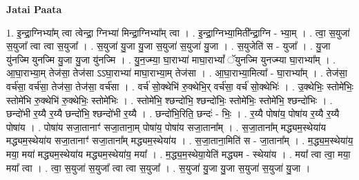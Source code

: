 \documentclass[17pt]{extarticle}
\begin{document}
\textbf{Jatai Paata} \newline

1. इ॒न्द्रा॒ग्निभ्या᳚म् त्वा त्वेन्द्रा॒ ग्निभ्या॑ मिन्द्रा॒ग्निभ्या᳚म् त्वा । . इ॒न्द्रा॒ग्निभ्या॒मिती᳚न्द्रा॒ग्नि - भ्या॒म् । . त्वा॒ स॒युजा॑ स॒युजा᳚ त्वा त्वा स॒युजा᳚ । . स॒युजा॑ यु॒जा यु॒जा स॒युजा॑ स॒युजा॑ यु॒जा । . स॒युजेति॑ स - युजा᳚ । . यु॒जा यु॑नज्मि युनज्मि यु॒जा यु॒जा यु॑नज्मि । . यु॒न॒ज्म्या॒ घा॒राभ्या॑ माघा॒राभ्यां᳚ ॅयुनज्मि युनज्म्या घा॒राभ्या᳚म् । . आ॒घा॒राभ्या॒म् तेज॑सा॒ तेज॑सा ऽऽघा॒राभ्या॑ माघा॒राभ्या॒म् तेज॑सा । . आ॒घा॒राभ्या॒मित्या᳚ - घा॒राभ्या᳚म् । . तेज॑सा॒ वर्च॑सा॒ वर्च॑सा॒ तेज॑सा॒ तेज॑सा॒ वर्च॑सा । . वर्च॑ सो॒क्थेभि॑ रु॒क्थेभि॒र् वर्च॑सा॒ वर्च॑ सो॒क्थेभिः॑ । . उ॒क्थेभिः॒ स्तोमे॑भिः॒ स्तोमे॑भि रु॒क्थेभि॑ रु॒क्थेभिः॒ स्तोमे॑भिः । . स्तोमे॑भि॒ श्छन्दो॑भि॒ श्छन्दो॑भिः॒ स्तोमे॑भिः॒ स्तोमे॑भि॒ श्छन्दो॑भिः । . छन्दो॑भी र॒य्यै र॒य्यै छन्दो॑भि॒ श्छन्दो॑भी र॒य्यै । . छन्दो॑भि॒रिति॒ छन्दः॑ - भिः॒ । . र॒य्यै पोषा॑य॒ पोषा॑य र॒य्यै र॒य्यै पोषा॑य । . पोषा॑य सजा॒तानाꣳ॑ सजा॒ताना॒म् पोषा॑य॒ पोषा॑य सजा॒ताना᳚म् । . स॒जा॒ताना᳚म् मद्ध्यम॒स्थेया॑य मद्ध्यम॒स्थेया॑य सजा॒तानाꣳ॑ सजा॒ताना᳚म् मद्ध्यम॒स्थेया॑य । . स॒जा॒ताना॒मिति॑ स - जा॒ताना᳚म् । . म॒द्ध्य॒म॒स्थेया॑य॒ मया॒ मया॑ मद्ध्यम॒स्थेया॑य मद्ध्यम॒स्थेया॑य॒ मया᳚ । . म॒द्ध्य॒म॒स्थेया॒येति॑ मद्ध्यम - स्थेया॑य । . मया᳚ त्वा त्वा॒ मया॒ मया᳚ त्वा । . त्वा॒ स॒युजा॑ स॒युजा᳚ त्वा त्वा स॒युजा᳚ । . स॒युजा॑ यु॒जा यु॒जा स॒युजा॑ स॒युजा॑ यु॒जा । \newline
\end{document}

